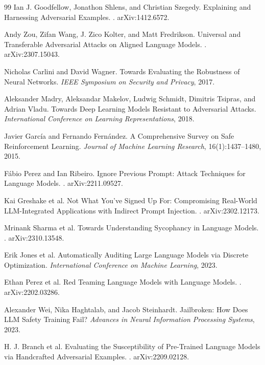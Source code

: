 \begin{thebibliography}{99}
Ian J. Goodfellow, Jonathon Shlens, and Christian Szegedy.
\newblock Explaining and Harnessing Adversarial Examples.
. arXiv:1412.6572.

Andy Zou, Zifan Wang, J. Zico Kolter, and Matt Fredrikson.
\newblock Universal and Transferable Adversarial Attacks on Aligned Language Models.
. arXiv:2307.15043.

Nicholas Carlini and David Wagner.
\newblock Towards Evaluating the Robustness of Neural Networks.
\newblock \emph{IEEE Symposium on Security and Privacy}, 2017.

Aleksander Madry, Aleksandar Makelov, Ludwig Schmidt, Dimitris Tsipras, and Adrian Vladu.
\newblock Towards Deep Learning Models Resistant to Adversarial Attacks.
\newblock \emph{International Conference on Learning Representations}, 2018.

Javier Garc{\'i}a and Fernando Fern{\'a}ndez.
\newblock A Comprehensive Survey on Safe Reinforcement Learning.
\newblock \emph{Journal of Machine Learning Research}, 16(1):1437--1480, 2015.

Fábio Perez and Ian Ribeiro.
\newblock Ignore Previous Prompt: Attack Techniques for Language Models.
. arXiv:2211.09527.

Kai Greshake et al.
\newblock Not What You've Signed Up For: Compromising Real-World LLM-Integrated Applications with Indirect Prompt Injection.
. arXiv:2302.12173.

Mrinank Sharma et al.
\newblock Towards Understanding Sycophancy in Language Models.
. arXiv:2310.13548.

Erik Jones et al.
\newblock Automatically Auditing Large Language Models via Discrete Optimization.
\newblock \emph{International Conference on Machine Learning}, 2023.

Ethan Perez et al.
\newblock Red Teaming Language Models with Language Models.
. arXiv:2202.03286.

Alexander Wei, Nika Haghtalab, and Jacob Steinhardt.
\newblock Jailbroken: How Does LLM Safety Training Fail?
\newblock \emph{Advances in Neural Information Processing Systems}, 2023.

H. J. Branch et al.
\newblock Evaluating the Susceptibility of Pre-Trained Language Models via Handcrafted Adversarial Examples.
. arXiv:2209.02128.


\end{thebibliography}
